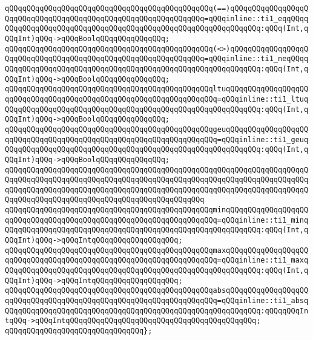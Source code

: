 \verb|qQQqqQQqqQQqqQQqqQQqqQQqqQQqqQQqqQQqqQQqqQQqqQQq(==)qQQqqQQqqQQqqQQqqQQqqQQqqQQqqQQqqQQqqQQqqQQqqQQqqQQqqQQqqQQqqQQq=qQQqinline::ti1_eqqQQqqQQqqQQqqQQqqQQqqQQqqQQqqQQqqQQqqQQqqQQqqQQqqQQqqQQqqQQqqQQq:qQQq(Int,qQQqInt)qQQq->qQQqBoolqQQqqQQqqQQqqQQq;|\newline
\verb|qQQqqQQqqQQqqQQqqQQqqQQqqQQqqQQqqQQqqQQqqQQqqQQq(<>)qQQqqQQqqQQqqQQqqQQqqQQqqQQqqQQqqQQqqQQqqQQqqQQqqQQqqQQqqQQqqQQq=qQQqinline::ti1_neqQQqqQQqqQQqqQQqqQQqqQQqqQQqqQQqqQQqqQQqqQQqqQQqqQQqqQQqqQQqqQQq:qQQq(Int,qQQqInt)qQQq->qQQqBoolqQQqqQQqqQQqqQQq;|\newline
\verb|qQQqqQQqqQQqqQQqqQQqqQQqqQQqqQQqqQQqqQQqqQQqqQQqltuqQQqqQQqqQQqqQQqqQQqqQQqqQQqqQQqqQQqqQQqqQQqqQQqqQQqqQQqqQQqqQQqqQQq=qQQqinline::ti1_ltuqQQqqQQqqQQqqQQqqQQqqQQqqQQqqQQqqQQqqQQqqQQqqQQqqQQqqQQqqQQq:qQQq(Int,qQQqInt)qQQq->qQQqBoolqQQqqQQqqQQqqQQq;|\newline
\verb|qQQqqQQqqQQqqQQqqQQqqQQqqQQqqQQqqQQqqQQqqQQqqQQqgeuqQQqqQQqqQQqqQQqqQQqqQQqqQQqqQQqqQQqqQQqqQQqqQQqqQQqqQQqqQQqqQQqqQQq=qQQqinline::ti1_geuqQQqqQQqqQQqqQQqqQQqqQQqqQQqqQQqqQQqqQQqqQQqqQQqqQQqqQQqqQQq:qQQq(Int,qQQqInt)qQQq->qQQqBoolqQQqqQQqqQQqqQQq;|\newline
\verb|qQQqqQQqqQQqqQQqqQQqqQQqqQQqqQQqqQQqqQQqqQQqqQQqqQQqqQQqqQQqqQQqqQQqqQQqqQQqqQQqqQQqqQQqqQQqqQQqqQQqqQQqqQQqqQQqqQQqqQQqqQQqqQQqqQQqqQQqqQQqqQQqqQQqqQQqqQQqqQQqqQQqqQQqqQQqqQQqqQQqqQQqqQQqqQQqqQQqqQQqqQQqqQQqqQQqqQQqqQQqqQQqqQQqqQQqqQQqqQQqqQQqqQQqqQQqqQQq|\newline
\verb|qQQqqQQqqQQqqQQqqQQqqQQqqQQqqQQqqQQqqQQqqQQqqQQqminqQQqqQQqqQQqqQQqqQQqqQQqqQQqqQQqqQQqqQQqqQQqqQQqqQQqqQQqqQQqqQQqqQQq=qQQqinline::ti1_minqQQqqQQqqQQqqQQqqQQqqQQqqQQqqQQqqQQqqQQqqQQqqQQqqQQqqQQqqQQq:qQQq(Int,qQQqInt)qQQq->qQQqIntqQQqqQQqqQQqqQQqqQQq;|\newline
\verb|qQQqqQQqqQQqqQQqqQQqqQQqqQQqqQQqqQQqqQQqqQQqqQQqmaxqQQqqQQqqQQqqQQqqQQqqQQqqQQqqQQqqQQqqQQqqQQqqQQqqQQqqQQqqQQqqQQqqQQq=qQQqinline::ti1_maxqQQqqQQqqQQqqQQqqQQqqQQqqQQqqQQqqQQqqQQqqQQqqQQqqQQqqQQqqQQq:qQQq(Int,qQQqInt)qQQq->qQQqIntqQQqqQQqqQQqqQQqqQQq;|\newline
\verb|qQQqqQQqqQQqqQQqqQQqqQQqqQQqqQQqqQQqqQQqqQQqqQQqabsqQQqqQQqqQQqqQQqqQQqqQQqqQQqqQQqqQQqqQQqqQQqqQQqqQQqqQQqqQQqqQQqqQQq=qQQqinline::ti1_absqQQqqQQqqQQqqQQqqQQqqQQqqQQqqQQqqQQqqQQqqQQqqQQqqQQqqQQqqQQq:qQQqqQQqIntqQQq->qQQqIntqQQqqQQqqQQqqQQqqQQqqQQqqQQqqQQqqQQqqQQqqQQq;|\newline
\verb|qQQqqQQqqQQqqQQqqQQqqQQqqQQqqQQq};|\newline
\newline
